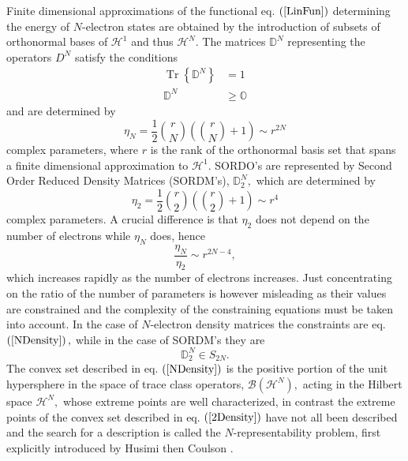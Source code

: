 \documentclass[aps,preprint]{revtex4}%
\begin{document}
Finite dimensional approximations of the functional eq. $\left(
\ref{LinFun}\right)  $ determining the energy of $N$-electron states are
obtained by the introduction of subsets of orthonormal bases of $\mathcal{H}%
^{1}$ and thus $\mathcal{H}^{N}.$ The matrices $\mathbb{D}^{N}$ representing
the operators $D^{N}$ satisfy the conditions
\begin{align}
\operatorname*{Tr}\left\{  \mathbb{D}^{N}\right\}   &  =1\nonumber\\
\mathbb{D}^{N}  &  \geq\mathbb{O} \label{NDensity}%
\end{align}
and are determined by
\begin{equation}
\eta_{N}=\frac{1}{2}\binom{r}{N}\left(  \binom{r}{N}+1\right)  \sim r^{2N}
\label{NDenSize}%
\end{equation}
complex parameters, where $r$ is the rank of the orthonormal basis set that
spans a finite dimensional approximation to $\mathcal{H}^{1}.$ SORDO's are
represented by Second Order Reduced Density Matrices (SORDM's), $\mathbb{D}%
_{2}^{N},$ which are determined by
\begin{equation}
\eta_{2}=\frac{1}{2}\binom{r}{2}\left(  \binom{r}{2}+1\right)  \sim r^{4}
\label{2DenSize}%
\end{equation}
complex parameters. A crucial difference is that $\eta_{2}$ does not depend on
the number of electrons while $\eta_{N}$ does, hence
\begin{equation}
\frac{\eta_{N}}{\eta_{2}}\sim r^{2N-4}, \label{RatioSize}%
\end{equation}
which increases rapidly as the number of electrons increases. Just
concentrating on the ratio of the number of parameters is however misleading
as their values are constrained and the complexity of the constraining
equations must be taken into account. In the case of $N$-electron density
matrices the constraints are eq. $\left(  \ref{NDensity}\right)  ,$ while in
the case of SORDM's they are
\begin{equation}
\mathbb{D}_{2}^{N}\in S_{2N}. \label{2Density}%
\end{equation}
The convex set described in eq. $\left(  \ref{NDensity}\right)  $ is the
positive portion of the unit hypersphere in the space of trace class
operators, $\mathcal{B}\left(  \mathcal{H}^{N}\right)  ,$ acting in the
Hilbert space $\mathcal{H}^{N},$ whose extreme points are well characterized,
in contrast the extreme points of the convex set described in eq. $\left(
\ref{2Density}\right)  $ have not all been described and the search for a
description is called the $N$-representability problem, first explicitly
introduced by Husimi \cite{Husimi} then Coulson \cite{Coulson}.
\end{document}
